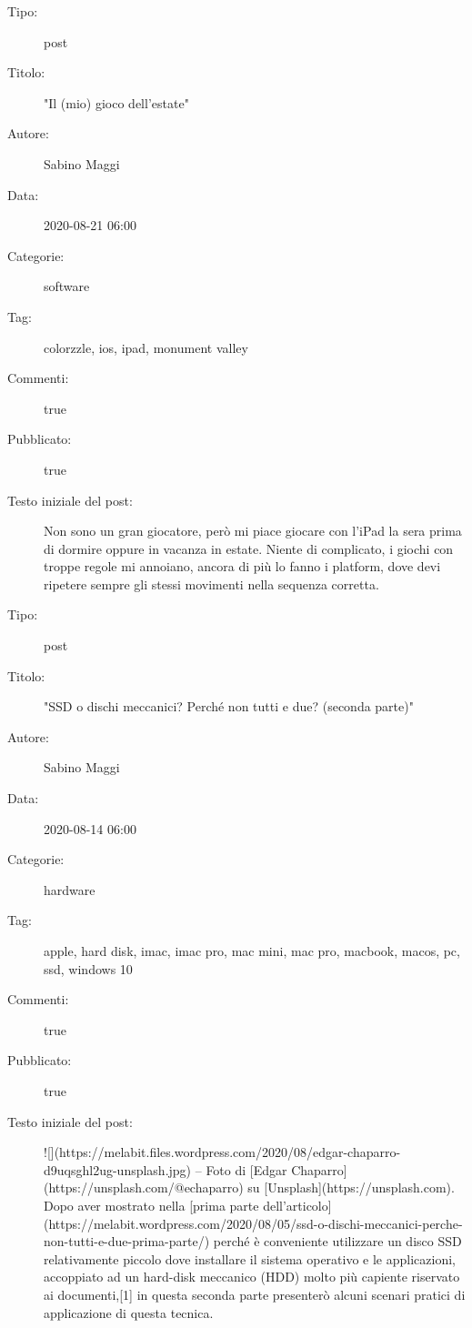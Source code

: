 \documentclass[11pt,oneside,a4paper]{report}
\begin{document}
\begin{framed}
\begin{description}
    \item[Tipo:] post
    \item[Titolo:] "Il (mio) gioco dell'estate"
    \item[Autore:] Sabino Maggi
    \item[Data:] 2020-08-21 06:00
    \item[Categorie:] software
    \item[Tag:] colorzzle, ios, ipad, monument valley
    \item[Commenti:] true
    \item[Pubblicato:] true
    \item[Testo iniziale del post:] 
    Non sono un gran giocatore, però mi piace giocare con l'iPad la sera prima di dormire
    oppure in vacanza in estate. Niente di complicato, i giochi con troppe regole mi annoiano,
    ancora di più lo fanno i platform, dove devi ripetere sempre gli stessi movimenti nella
    sequenza corretta.
\end{description}
\end{framed}

\begin{framed}
\begin{description}
    \item[Tipo:] post
    \item[Titolo:] "SSD o dischi meccanici? Perché non tutti e due? (seconda parte)"
    \item[Autore:] Sabino Maggi
    \item[Data:] 2020-08-14 06:00
    \item[Categorie:] hardware
    \item[Tag:] apple, hard disk, imac, imac pro, mac mini, mac pro, macbook, macos, pc, ssd, windows 10
    \item[Commenti:] true
    \item[Pubblicato:] true
    \item[Testo iniziale del post:] 
    ![](https://melabit.files.wordpress.com/2020/08/edgar-chaparro-d9uqsghl2ug-unsplash.jpg)
    -- Foto di [Edgar Chaparro](https://unsplash.com/@echaparro) su
    [Unsplash](https://unsplash.com).
    Dopo aver mostrato nella [prima parte
    dell'articolo](https://melabit.wordpress.com/2020/08/05/ssd-o-dischi-meccanici-perche-
    non-tutti-e-due-prima-parte/) perché è conveniente utilizzare un disco SSD relativamente
    piccolo dove installare il sistema operativo e le applicazioni, accoppiato ad un hard-disk
    meccanico (HDD) molto più capiente riservato ai documenti,[1] in questa seconda parte
    presenterò alcuni scenari pratici di applicazione di questa tecnica.
\end{description}
\end{framed}
\end{document}
